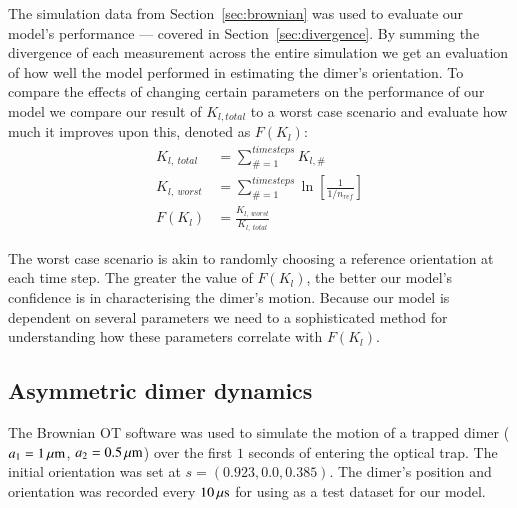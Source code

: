 \documentclass[final,  3p]{elsarticle}
\begin{document}
The simulation data from Section~\ref{sec:brownian} was used to evaluate our model's performance --- covered in Section~\ref{sec:divergence}. By summing the divergence of each measurement across the entire simulation we get an evaluation of how well the model performed in estimating the dimer's orientation. To compare the effects of changing certain parameters on the performance of our model we compare our result of $K_{l,total}$ to a worst case scenario and evaluate how much it improves upon this, denoted as $F(K_l)$:
\begin{align}
  K_{l, \ total} &= \sum\limits_{\# =1}^{timesteps} K_{l,\#}
  \\
  K_{l, \ worst} &= \sum\limits_{\#=1}^{timesteps} \ln \left[\frac{1}{1/n_{ref}} \right]
  \\
  F(K_l) &= \frac{K_{l,\ worst}}{K_{l, \ total}}
\end{align}

The worst case scenario is akin to randomly choosing a reference
orientation at each time step. The greater the value of $F(K_l)$, the
better our model's confidence is in characterising the dimer's
motion. Because our model is dependent on several parameters we need
to a sophisticated method for understanding how these parameters
correlate with $F(K_l)$.

\subsection{Asymmetric dimer dynamics}
\label{sec:motion}

The Brownian OT software was used to simulate the motion of a trapped dimer ($a_1=1\,\mu{\rm m}$, $a_2=0.5\,\mu{\rm m}$) over the first $1$ seconds of entering the optical trap.  The initial orientation was set at $s = (0.923, 0.0, 0.385)$. The dimer's position and orientation was recorded every $10\,{\rm \mu s}$ for using as a test dataset for our model.
\end{document}

